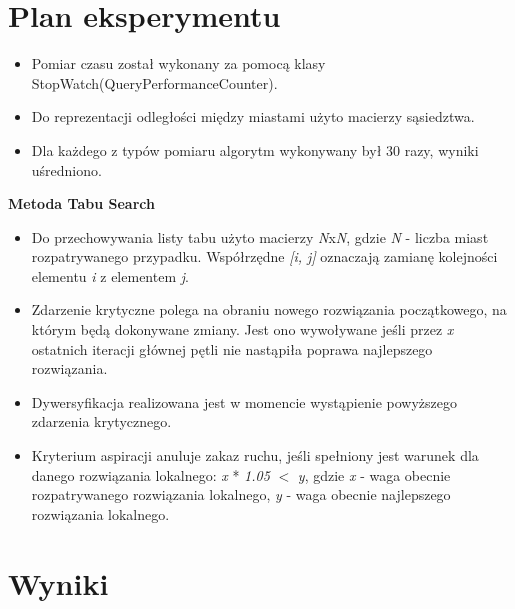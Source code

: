 \documentclass{article}
\begin{document}
\section{Plan eksperymentu}
\par
\begin{itemize}
\item Pomiar czasu został wykonany za pomocą klasy StopWatch(QueryPerformanceCounter).
\item Do reprezentacji odległości między miastami użyto macierzy sąsiedztwa.
\item Dla każdego z typów pomiaru algorytm wykonywany był 30 razy, wyniki uśredniono.
\end{itemize}

\textbf{Metoda Tabu Search}
\renewcommand\labelitemii{$\circ$}
\begin{itemize}
	\item Do przechowywania listy tabu użyto macierzy \textit{N}x\textit{N}, gdzie \textit{N} - liczba miast rozpatrywanego przypadku. Współrzędne \textit{[i, j]} oznaczają zamianę  kolejności elementu \textit{i} z elementem \textit{j}.
	\item Zdarzenie krytyczne polega na obraniu nowego rozwiązania początkowego, na którym będą dokonywane zmiany. Jest ono wywoływane jeśli przez \textit{x} ostatnich iteracji głównej pętli nie nastąpiła poprawa najlepszego rozwiązania.
	\item Dywersyfikacja realizowana jest w momencie wystąpienie powyższego zdarzenia krytycznego.
	\item Kryterium aspiracji anuluje zakaz ruchu, jeśli spełniony jest warunek dla danego rozwiązania lokalnego: \textit{x} * \textit{1.05} $<$  \textit{y}, gdzie \textit{x} - waga obecnie rozpatrywanego rozwiązania lokalnego, \newline \textit{y} - waga obecnie najlepszego rozwiązania lokalnego.
\end{itemize}
\newpage

\section{Wyniki}
\end{document}
